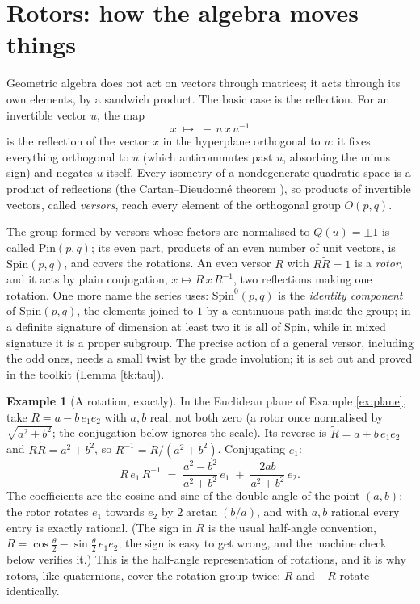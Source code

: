 \documentclass[11pt]{article}
\theoremstyle{plain}
\theoremstyle{definition}
\newtheorem{example}{Example}[section]
\newcommand{\Pin}{\mathrm{Pin}}
\newcommand{\Spin}{\mathrm{Spin}}
\begin{document}
\section{Rotors: how the algebra moves things}\label{sec:rotors}

Geometric algebra does not act on vectors through matrices; it acts through its own elements, by a sandwich product. The basic case is the reflection. For an invertible vector $u$, the map
\[
x \;\longmapsto\; -\,u\,x\,u^{-1}
\]
is the reflection of the vector $x$ in the hyperplane orthogonal to $u$: it fixes everything orthogonal to $u$ (which anticommutes past $u$, absorbing the minus sign) and negates $u$ itself. Every isometry of a nondegenerate quadratic space is a product of reflections (the Cartan--Dieudonn\'e theorem \cite{Lam2005}), so products of invertible vectors, called \emph{versors}, reach every element of the orthogonal group $O(p,q)$.

The group formed by versors whose factors are normalised to $Q(u) = \pm 1$ is called $\Pin(p,q)$; its even part, products of an even number of unit vectors, is $\Spin(p,q)$, and covers the rotations. An even versor $R$ with $R\tilde{R} = 1$ is a \emph{rotor}, and it acts by plain conjugation, $x \mapsto R\,x\,R^{-1}$, two reflections making one rotation. One more name the series uses: $\Spin^0(p,q)$ is the \emph{identity component} of $\Spin(p,q)$, the elements joined to $1$ by a continuous path inside the group; in a definite signature of dimension at least two it is all of $\Spin$, while in mixed signature it is a proper subgroup. The precise action of a general versor, including the odd ones, needs a small twist by the grade involution; it is set out and proved in the toolkit (Lemma \ref{tk:tau}).

\begin{example}[A rotation, exactly]\label{ex:rotor}
In the Euclidean plane of Example \ref{ex:plane}, take $R = a - b\,e_1 e_2$ with $a, b$ real, not both zero (a rotor once normalised by $\sqrt{a^2 + b^2}$; the conjugation below ignores the scale). Its reverse is $\tilde{R} = a + b\, e_1 e_2$ and $R\tilde{R} = a^{2} + b^{2}$, so $R^{-1} = \tilde{R}/(a^2 + b^2)$. Conjugating $e_1$:
\[
R\, e_1\, R^{-1} \;=\; \frac{a^{2} - b^{2}}{a^{2} + b^{2}}\, e_1 \;+\; \frac{2ab}{a^{2} + b^{2}}\, e_2 .
\]
The coefficients are the cosine and sine of the double angle of the point $(a,b)$: the rotor rotates $e_1$ towards $e_2$ by $2\arctan(b/a)$, and with $a, b$ rational every entry is exactly rational. (The sign in $R$ is the usual half-angle convention, $R = \cos\tfrac{\theta}{2} - \sin\tfrac{\theta}{2}\, e_1 e_2$; the sign is easy to get wrong, and the machine check below verifies it.) This is the half-angle representation of rotations, and it is why rotors, like quaternions, cover the rotation group twice: $R$ and $-R$ rotate identically.
\end{example}
\end{document}
